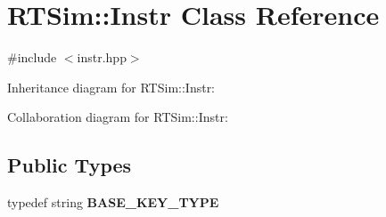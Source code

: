 \hypertarget{classRTSim_1_1Instr}{}\section{R\+T\+Sim\+:\+:Instr Class Reference}
\label{classRTSim_1_1Instr}


{\ttfamily \#include $<$instr.\+hpp$>$}



Inheritance diagram for R\+T\+Sim\+:\+:Instr\+:


Collaboration diagram for R\+T\+Sim\+:\+:Instr\+:
\subsection*{Public Types}
\begin{DoxyCompactItemize}
\item 
typedef string {\bfseries B\+A\+S\+E\+\_\+\+K\+E\+Y\+\_\+\+T\+Y\+PE}\hypertarget{classRTSim_1_1Instr_ad590bcd14258e8e85c72d1d972c439a3}{}\label{classRTSim_1_1Instr_ad590bcd14258e8e85c72d1d972c439a3}

\end{DoxyCompactItemize}
